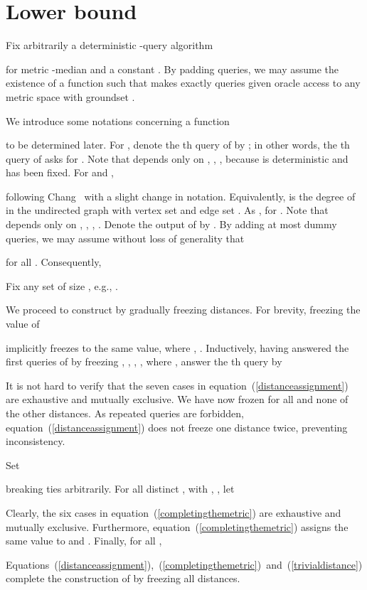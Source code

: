 \documentclass[letterpaper,12pt]{article}
\begin{document}
\section{Lower bound}

Fix arbitrarily a
deterministic
-query algorithm

for {\sc metric -median}
and a constant
.
By padding queries, we may assume the existence of a function
 such that  makes exactly
 queries given oracle access to any metric space with groundset
.

We introduce some notations concerning a function

to be determined later.
For , denote the th query of  by
; in other
words, the th query of  asks for .
Note that  depends only on , ,
,  because 
is deterministic and
has been fixed.
For  and ,

following Chang~\cite{Cha12} with a slight change in notation.
Equivalently,  is the degree of  in the undirected graph
with vertex set  and edge set .
As ,
 for .
Note that
 depends only on
, , , .
Denote the
output of 
by .
By adding at most  dummy queries,
we may
assume without loss of generality that

for all .
Consequently,

Fix any set  of size ,
e.g., .

We proceed to
construct  by gradually freezing distances.
For brevity, freezing
the value of

implicitly freezes  to the same value, where , .
Inductively, having
answered the first  queries of  by freezing
, , ,
, where ,
answer the th query by

It is not hard to verify that
the seven cases
in equation~(\ref{distanceassignment})
are
exhaustive and
mutually
exclusive.
We have now
frozen
 for all  and none of the other distances.
As repeated queries are forbidden, equation~(\ref{distanceassignment})
does not freeze one distance twice,
preventing inconsistency.

Set

breaking ties arbitrarily.
For all distinct
, 
with , ,
let

Clearly, the six cases in equation~(\ref{completingthemetric}) are
exhaustive and
mutually
exclusive.
Furthermore, equation~(\ref{completingthemetric}) assigns the same value
to  and .
Finally, for all ,

Equations~(\ref{distanceassignment}),~(\ref{completingthemetric})~and~(\ref{trivialdistance})
complete the construction of  by freezing all distances.
\end{document}
